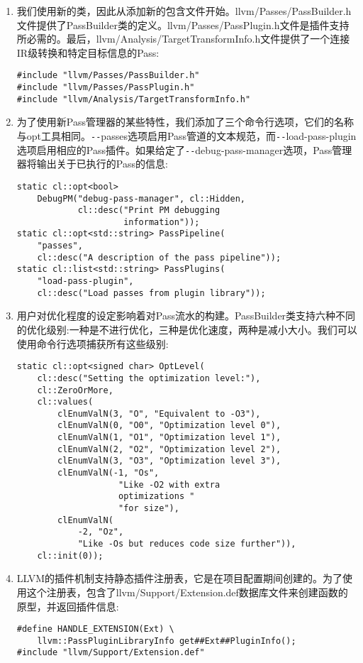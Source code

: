 \begin{enumerate}
\item 我们使用新的类，因此从添加新的包含文件开始。llvm/Passes/PassBuilder.h文件提供了PassBuilder类的定义。llvm/Passes/PassPlugin.h文件是插件支持所必需的。最后，llvm/Analysis/TargetTransformInfo.h文件提供了一个连接IR级转换和特定目标信息的Pass:
\begin{lstlisting}[caption={}]
#include "llvm/Passes/PassBuilder.h"
#include "llvm/Passes/PassPlugin.h"
#include "llvm/Analysis/TargetTransformInfo.h"
\end{lstlisting}

\item 为了使用新Pass管理器的某些特性，我们添加了三个命令行选项，它们的名称与opt工具相同。\verb|--|passes选项启用Pass管道的文本规范，而\verb|--|load-pass-plugin选项启用相应的Pass插件。如果给定了\verb|--|debug-pass-manager选项，Pass管理器将输出关于已执行的Pass的信息:
\begin{lstlisting}[caption={}]
static cl::opt<bool>
	DebugPM("debug-pass-manager", cl::Hidden,
			cl::desc("Print PM debugging 
					 information"));
static cl::opt<std::string> PassPipeline(
	"passes",
	cl::desc("A description of the pass pipeline"));
static cl::list<std::string> PassPlugins(
	"load-pass-plugin",
	cl::desc("Load passes from plugin library"));
\end{lstlisting}

\item 用户对优化程度的设定影响着对Pass流水的构建。PassBuilder类支持六种不同的优化级别:一种是不进行优化，三种是优化速度，两种是减小大小。我们可以使用命令行选项捕获所有这些级别:
\begin{lstlisting}[caption={}]
static cl::opt<signed char> OptLevel(
	cl::desc("Setting the optimization level:"),
	cl::ZeroOrMore,
	cl::values(
		clEnumValN(3, "O", "Equivalent to -O3"),
		clEnumValN(0, "O0", "Optimization level 0"),
		clEnumValN(1, "O1", "Optimization level 1"),
		clEnumValN(2, "O2", "Optimization level 2"),
		clEnumValN(3, "O3", "Optimization level 3"),
		clEnumValN(-1, "Os",
					"Like -O2 with extra 
					optimizations "
					"for size"),
		clEnumValN(
			-2, "Oz",
			"Like -Os but reduces code size further")),
	cl::init(0));
\end{lstlisting}

\item LLVM的插件机制支持静态插件注册表，它是在项目配置期间创建的。为了使用这个注册表，包含了llvm/Support/Extension.def数据库文件来创建函数的原型，并返回插件信息:
\begin{lstlisting}[caption={}]
#define HANDLE_EXTENSION(Ext) \
	llvm::PassPluginLibraryInfo get##Ext##PluginInfo();
#include "llvm/Support/Extension.def"
\end{lstlisting}


\end{enumerate}
